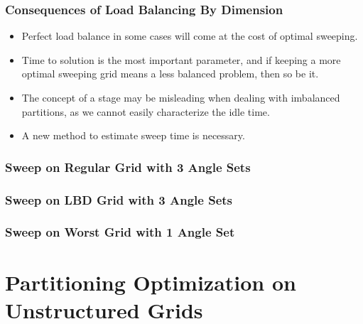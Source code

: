 \documentclass[xcolor={usenames,dvipsnames,svgnames,table}]{beamer}
\begin{document}
\begin{frame}[t]\frametitle{Consequences of Load Balancing By Dimension}
  \begin{block}{}
  \begin{itemize}
    \item Perfect load balance in some cases will come at the cost of optimal sweeping.
    \item Time to solution is the most important parameter, and if keeping a more optimal sweeping grid means a less balanced problem, then so be it.
    \item The concept of a stage may be misleading when dealing with imbalanced partitions, as we cannot easily characterize the idle time.
    \item A new method to estimate sweep time is necessary.
  \end{itemize}
  \end{block}
\end{frame}



\begin{frame}[t]\frametitle{Sweep on Regular Grid with 3 Angle Sets}
\end{frame}

\begin{frame}[t]\frametitle{Sweep on LBD Grid with 3 Angle Sets}
\end{frame}


\begin{frame}[t]\frametitle{Sweep on Worst Grid with 1 Angle Set}
\end{frame}

\section{Partitioning Optimization on Unstructured Grids}
\end{document}
